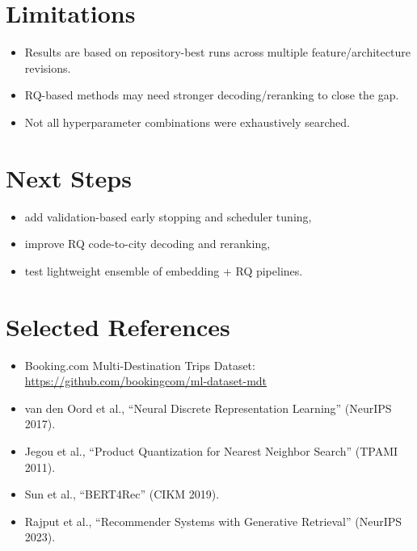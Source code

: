 \documentclass[11pt]{article}
\begin{document}
\section*{Limitations}
\begin{itemize}[leftmargin=1.5em]
    \item Results are based on repository-best runs across multiple feature/architecture revisions.
    \item RQ-based methods may need stronger decoding/reranking to close the gap.
    \item Not all hyperparameter combinations were exhaustively searched.
\end{itemize}

\section*{Next Steps}
\begin{itemize}[leftmargin=1.5em]
    \item add validation-based early stopping and scheduler tuning,
    \item improve RQ code-to-city decoding and reranking,
    \item test lightweight ensemble of embedding + RQ pipelines.
\end{itemize}

\section*{Selected References}
\begin{itemize}[leftmargin=1.5em]
    \item Booking.com Multi-Destination Trips Dataset: \url{https://github.com/bookingcom/ml-dataset-mdt}
    \item van den Oord et al., ``Neural Discrete Representation Learning'' (NeurIPS 2017).
    \item Jegou et al., ``Product Quantization for Nearest Neighbor Search'' (TPAMI 2011).
    \item Sun et al., ``BERT4Rec'' (CIKM 2019).
    \item Rajput et al., ``Recommender Systems with Generative Retrieval'' (NeurIPS 2023).
\end{itemize}
\end{document}
